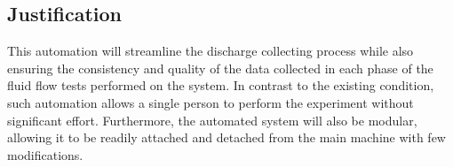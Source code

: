 \subsection{Justification}
This automation will streamline the discharge collecting process while also ensuring the consistency and quality of the data collected in each phase of the fluid flow tests performed on the system. In contrast to the existing condition, such automation allows a single person to perform the experiment without significant effort. Furthermore, the automated system will also be modular, allowing it to be readily attached and detached from the main machine with few modifications.
